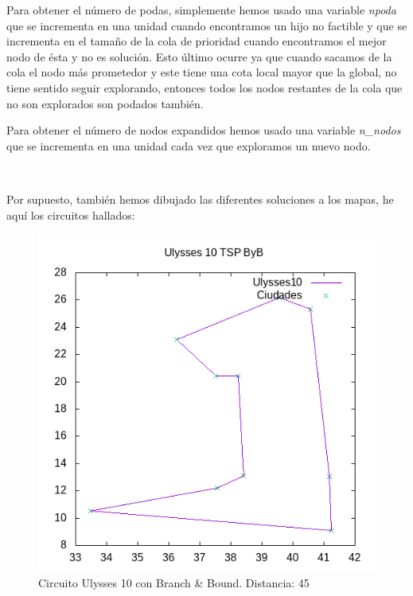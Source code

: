 \documentclass{article}
\begin{document}
	Para obtener el número de podas, simplemente hemos usado una variable \textit{npoda} que se incrementa en una unidad cuando encontramos un hijo no factible y que se incrementa en el tamaño de la cola de prioridad cuando encontramos el mejor nodo de ésta y no es solución. Esto último ocurre ya que cuando sacamos de la cola el nodo más prometedor y este tiene una cota local mayor que la global, no tiene sentido seguir explorando, entonces todos los nodos restantes de la cola que no son explorados son podados también.
	\
	
	Para obtener el número de nodos expandidos hemos usado una variable \textit{n\_nodos} que se incrementa en una unidad cada vez que exploramos un nuevo nodo.
	
	\
	
	Por supuesto, también hemos dibujado las diferentes soluciones a los mapas, he aquí los circuitos hallados:
	
	\begin{figure}[H]
		\centering
		\includegraphics[totalheight=6cm]{ulysses10byb}
		\caption{Circuito Ulysses 10 con Branch \& Bound. Distancia: 45}
		\label{fig:u10byb}
	\end{figure}
\end{document}
